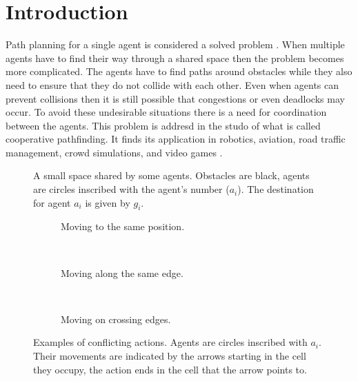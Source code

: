 \section{Introduction}\label{sec:intro}
Path planning for a single agent is considered a solved problem
\cite{sharon2013}. When multiple agents have to find their way through a
shared
space then the problem becomes more complicated. The agents have to find paths
around obstacles while they also need to ensure that they do not collide with
each other. Even when agents can prevent collisions then it is still possible
that congestions or even deadlocks may occur. To avoid these undesirable
situations there is a need for coordination between the agents. This problem is
addresd in the studo of what is called cooperative pathfinding. It finds its
application in robotics, aviation, road traffic management, crowd simulations,
and video games \cite{standley2011}.

\begin{figure}[t]
    \centering
    \def\svgscale{.5}
    
    \caption{A small space shared by some agents. Obstacles are black, agents
        are circles inscribed with the agent's number ($a_i$). The destination
        for agent $a_i$ is given by $g_i$.}
    \label{fig:world}
\end{figure}

\begin{figure}[t]
    \centering
    \begin{subfigure}[b]{.18\textwidth}
        \centering
        \def\svgscale{.5}
        
        \caption{Moving to the same position.}
        \label{fig:conflict-position}
    \end{subfigure}
    ~
    \begin{subfigure}[b]{.13\textwidth}
        \centering
        \def\svgscale{.5}
        
        \caption{Moving along the same edge.}
        \label{fig:conflict-same}
    \end{subfigure}
    ~
    \begin{subfigure}[b]{.13\textwidth}
        \centering
        \def\svgscale{.5}
        
        \caption{Moving on crossing edges.}
        \label{fig:conflict-crossing}
    \end{subfigure}
    \caption{Examples of conflicting actions. Agents are circles inscribed with
        $a_i$. Their movements are indicated by the arrows starting in the cell
        they occupy, the action ends in the cell that the arrow points to.}
    \label{fig:conflicts}
\end{figure}

